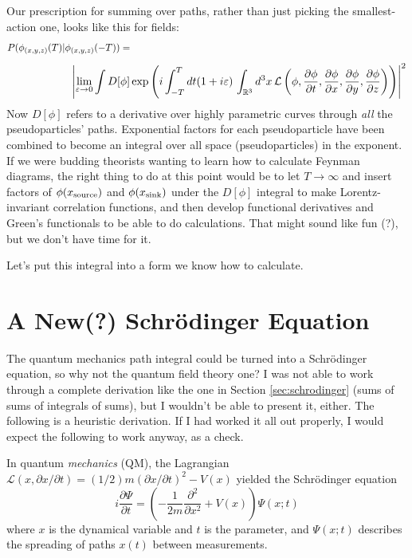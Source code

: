 \documentclass[12pt]{article}
\begin{document}
Our prescription for summing over paths, rather than just picking the
smallest-action one, looks like this for fields:
\[ P(\phi_{(x,y,z)}(T) | \phi_{(x,y,z)}(-T)) = \mbox{\hspace{10 cm}} \]
\begin{equation}
  \mbox{\hspace{2 cm}} \left| \lim_{\varepsilon \to
  0} \int D[\phi] \exp\left(i \int_{-T}^T dt (1 + i \varepsilon) \,
  \int_{\mathbb{R}^3} d^3 x \, \mathcal{L}\left(\phi, \frac{\partial \phi}{\partial
  t}, \frac{\partial \phi}{\partial x}, \frac{\partial \phi}{\partial
  y}, \frac{\partial \phi}{\partial z}\right) \right) \right|^2
\end{equation}
Now $D[\phi]$ refers to a derivative over highly parametric curves
through {\it all} the pseudoparticles' paths.  Exponential factors for
each pseudoparticle have been combined to become an integral over all
space (pseudoparticles) in the exponent.  If we were budding theorists
wanting to learn how to calculate Feynman diagrams, the right thing to
do at this point would be to let $T \to \infty$ and insert factors of
$\phi(x_{\mbox{\scriptsize source}})$ and $\phi(x_{\mbox{\scriptsize
sink}})$ under the $D[\phi]$ integral to make Lorentz-invariant
correlation functions, and then develop functional derivatives and
Green's functionals to be able to do calculations.  That might sound
like fun (?), but we don't have time for it.

Let's put this integral into a form we know how to calculate.

\section{A New(?) Schr\"odinger Equation}

The quantum mechanics path integral could be turned into a
Schr\"odinger equation, so why not the quantum field theory one?  I
was not able to work through a complete derivation like the one in
Section \ref{sec:schrodinger} (sums of sums of integrals of sums), but
I wouldn't be able to present it, either.  The following is a
heuristic derivation.  If I had worked it all out properly, I would
expect the following to work anyway, as a check.

In quantum {\it mechanics} (QM), the Lagrangian $\mathcal{L}(x,
\partial x/\partial t) = (1/2) m (\partial x/\partial t)^2 - V(x)$
yielded the Schr\"odinger equation
\[ i \frac{\partial \Psi}{\partial t} = \left( -\frac{1}{2m}
\frac{\partial^2}{\partial x^2} + V(x) \right) \Psi(x;t) \]
where $x$ is the dynamical variable and $t$ is the parameter, and
$\Psi(x;t)$ describes the spreading of paths $x(t)$ between
measurements.
\end{document}
